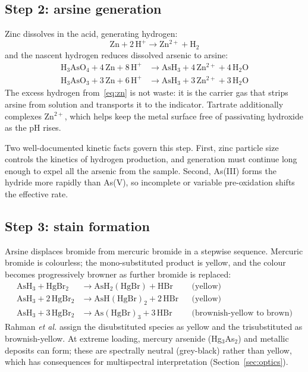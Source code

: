 \documentclass[11pt,a4paper]{article}
\begin{document}
\subsection{Step 2: arsine generation}

Zinc dissolves in the acid, generating hydrogen:
\begin{equation}
  \mathrm{Zn} + 2\,\mathrm{H^+} \longrightarrow
  \mathrm{Zn^{2+}} + \mathrm{H_2}
  \label{eq:zn}
\end{equation}
and the nascent hydrogen reduces dissolved arsenic to arsine:
\begin{align}
  \mathrm{H_3AsO_4} + 4\,\mathrm{Zn} + 8\,\mathrm{H^+}
    &\longrightarrow \mathrm{AsH_3} + 4\,\mathrm{Zn^{2+}}
    + 4\,\mathrm{H_2O} \\
  \mathrm{H_3AsO_3} + 3\,\mathrm{Zn} + 6\,\mathrm{H^+}
    &\longrightarrow \mathrm{AsH_3} + 3\,\mathrm{Zn^{2+}}
    + 3\,\mathrm{H_2O}
\end{align}
The excess hydrogen from~\eqref{eq:zn} is not waste: it is the carrier gas
that strips arsine from solution and transports it to the indicator.
Tartrate additionally complexes Zn$^{2+}$, which helps keep the metal
surface free of passivating hydroxide as the pH rises.

Two well-documented kinetic facts govern this step. First, zinc particle
size controls the kinetics of hydrogen production, and generation must
continue long enough to expel all the arsenic from the sample. Second,
As(III) forms the hydride more rapidly than As(V), so incomplete or variable
pre-oxidation shifts the effective rate.

\subsection{Step 3: stain formation}

Arsine displaces bromide from mercuric bromide in a stepwise sequence.
Mercuric bromide is colourless; the mono-substituted product is yellow, and
the colour becomes progressively browner as further bromide is replaced:
\begin{align}
  \mathrm{AsH_3} + \mathrm{HgBr_2} &\rightarrow
    \mathrm{AsH_2(HgBr)} + \mathrm{HBr}
    &&\text{(yellow)}\\
  \mathrm{AsH_3} + 2\,\mathrm{HgBr_2} &\rightarrow
    \mathrm{AsH(HgBr)_2} + 2\,\mathrm{HBr}
    &&\text{(yellow)}\\
  \mathrm{AsH_3} + 3\,\mathrm{HgBr_2} &\rightarrow
    \mathrm{As(HgBr)_3} + 3\,\mathrm{HBr}
    &&\text{(brownish-yellow to brown)}
  \label{eq:tri}
\end{align}
Rahman \emph{et al.} assign the disubstituted species as yellow and the
trisubstituted as brownish-yellow. At extreme loading, mercury arsenide
(Hg$_3$As$_2$) and metallic deposits can form; these are spectrally neutral
(grey-black) rather than yellow, which has consequences for multispectral
interpretation (Section~\ref{sec:optics}).
\end{document}
